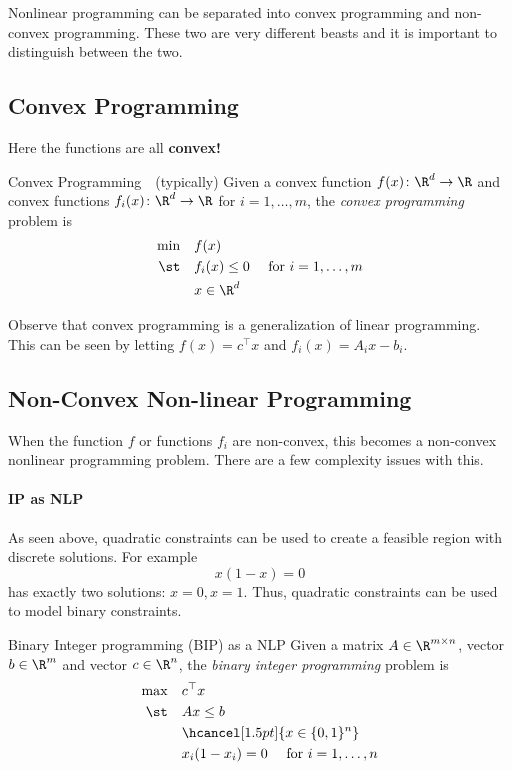 Nonlinear programming can be separated into convex programming and non-convex programming.  These two are very different beasts and it is important to distinguish between the two.
\subsection{Convex Programming}
Here the functions are all \textbf{convex!}
\begin{general}{Convex Programming}{\polynomial\ \  (typically)}
Given a convex function $f(x)\colon \R^d \to \R$ and convex functions $f_i(x)\colon \R^d \to \R$ for $i=1, \dots, m$,  the \emph{convex programming} problem is
\begin{equation}
\label{eq:convex-programming}
\begin{split}
\min \quad & f(x)\\
\st  \quad & f_i(x) \leq 0  \quad  \text{ for } i=1, \dots, m\\
& x \in \R^d
\end{split}
\end{equation}
\end{general}

Observe that convex programming is a generalization of linear programming.  This can be seen by letting $f(x) = c^\top x$ and $f_i(x) = A_i x - b_i$.  

\subsection{Non-Convex Non-linear Programming}
When the function $f$ or functions $f_i$ are non-convex, this becomes a non-convex nonlinear programming problem.  There are a few complexity issues with this.

\paragraph{IP as NLP}
As seen above, quadratic constraints can be used to create a feasible region with discrete solutions.  For example 
$$
x(1-x) = 0
$$
has exactly two solutions: $x = 0, x=1$.  
Thus, quadratic constraints can be used to model binary constraints.
\begin{general}{Binary Integer programming (BIP) as a NLP}{\nphard}
Given a matrix $A \in \R^{m\times n}$, vector $b \in \R^m$ and vector $c \in \R^n$, the \emph{binary integer programming} problem is
\begin{equation}
\label{eq:BIP}
\begin{split}
\max \quad & c^\top x\\
\st  \quad & Ax \leq b\\
& \hcancel[1.5pt]{x \in \{0,1\}^n}\\
& x_i(1-x_i) = 0 \quad \text{ for } i=1, \dots, n
\end{split}
\end{equation}
\end{general}

